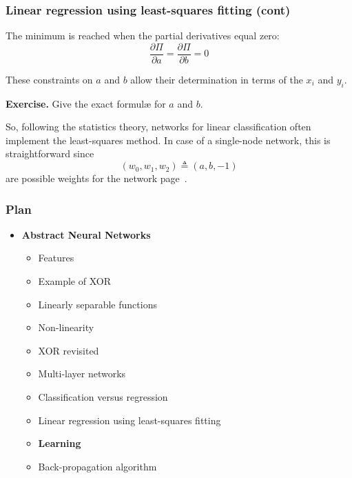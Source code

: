 %
\begin{frame}
\frametitle{Linear regression using
  least-squares fitting (cont)}

The minimum is reached when the partial derivatives equal zero:
\[
  \frac{\partial\Pi}{\partial{a}} =
  \frac{\partial\Pi}{\partial{b}} = 0
\]

\bigskip

These constraints on \(a\) and \(b\) allow their determination in
terms of the \(x_i\) and \(y_i\).

\bigskip

\textbf{Exercise.} Give the exact formul{\ae} for \(a\) and \(b\).

\bigskip

So, following the statistics theory, networks for linear
classification often implement the least-squares method. In case of a
single-node network, this is straightforward since
\[(w_0, w_1, w_2) \triangleq (a, b, -1)\]
are possible weights for the network page~\pageref{linearity}.

\end{frame}

%
\begin{frame}
\frametitle{Plan}

\begin{itemize}

  \item \textbf{Abstract Neural Networks}

  \begin{itemize}

    \item Features

    \item Example of XOR

    \item Linearly separable functions

    \item Non-linearity

    \item XOR revisited

    \item Multi-layer networks

    \item Classification versus regression

    \item Linear regression using least-squares fitting

    \item \textbf{Learning}

    \item Back-propagation algorithm

  \end{itemize}

\end{itemize}

\end{frame}


